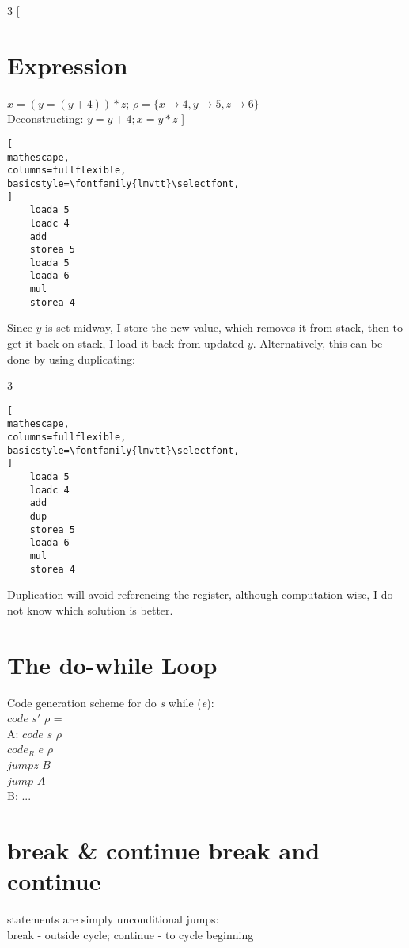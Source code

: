 \documentclass{report}
\begin{document}
\begin{multicols}{3}
[
\section{Expression}
$x=(y=(y+4))*z$; $\rho=\{x\to4, y\to5, z\to6\}$\\
Deconstructing: $y=y + 4; x = y * z$
]
\begin{lstlisting}[
mathescape,
columns=fullflexible,
basicstyle=\fontfamily{lmvtt}\selectfont,
]
    loada 5
    loadc 4
    add
    storea 5
    loada 5
    loada 6
    mul
    storea 4
\end{lstlisting}
\end{multicols}
Since $y$ is set midway, I store the new value, which removes it from stack, then to get it back on stack, I load it back from updated $y$. Alternatively, this can be done by using duplicating:
\begin{multicols}{3}
\begin{lstlisting}[
mathescape,
columns=fullflexible,
basicstyle=\fontfamily{lmvtt}\selectfont,
]
    loada 5
    loadc 4
    add
    dup
    storea 5
    loada 6
    mul
    storea 4
\end{lstlisting}
\end{multicols}
Duplication will avoid referencing the register, although computation-wise, I do not know which solution is better.


\section{The {\selectfont do-while} Loop}
Code generation scheme for {\selectfont do \textit{s} while (\textit{e})}:\\
{\color{OliveGreen}$code$} $s'$ $\rho$ =\\
\hspace*{1.5cm} {\color{RoyalBlue}A:} {\color{OliveGreen}$code$} $s$ $\rho$\\
\hspace*{2cm} {\color{OliveGreen}$code_R$} $e$ $\rho$\\
\hspace*{2cm} {\color{RoyalBlue}$jumpz$ $B$}\\
\hspace*{2cm} {\color{RoyalBlue}$jump$ $A$}\\
\hspace*{1.5cm} {\color{RoyalBlue}B:} ...

\section{{\selectfont break} \& {\selectfont continue}
{\selectfont break} and {\selectfont continue}} statements are simply unconditional jumps:\\
break - outside cycle;
continue - to cycle beginning
\end{document}
